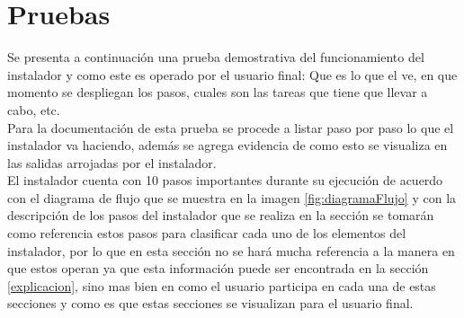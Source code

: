 \section{Pruebas}
Se presenta a continuación una prueba demostrativa del funcionamiento del instalador y como este es operado por el usuario final: Que es lo que el ve, en que momento se despliegan los pasos, cuales son las tareas que tiene que llevar a cabo, etc.
\\
Para la documentación de esta prueba se procede a listar paso por paso lo que el instalador va haciendo, además se agrega evidencia de como esto se visualiza en las salidas arrojadas por el instalador.
\\
El instalador cuenta con 10 pasos importantes durante su ejecución de acuerdo con el diagrama de flujo que se muestra en la imagen \ref{fig:diagramaFlujo} y con la descripción de los pasos del instalador que se realiza en la sección  se tomarán como referencia estos pasos para clasificar cada uno de los elementos del instalador, por lo que en esta sección no se hará mucha referencia a la manera en que estos operan ya que esta información puede ser encontrada en la sección \ref{explicacion}, sino mas bien en como el usuario participa en cada una de estas secciones y como es que estas secciones se visualizan para el usuario final.
\\
